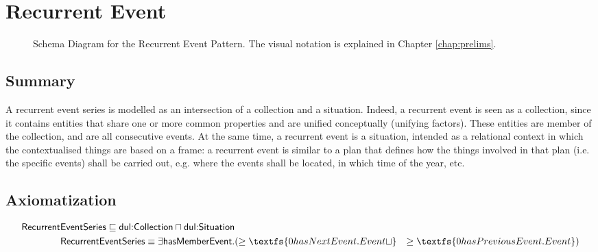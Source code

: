 \section{Recurrent Event}
\label{sec:recurrent-event}
\begin{figure}[h!]
\begin{center}
\end{center}
\caption{Schema Diagram for the Recurrent Event Pattern. The visual notation is explained in Chapter \ref{chap:prelims}.}
\label{fig:recurrent-event}
\end{figure}
\subsection{Summary}
\label{sum:recurrent-event}
A recurrent event series is modelled as an intersection of a collection and a situation. Indeed, a recurrent event is seen as a collection, since it contains entities that share one or more common properties and are unified conceptually (unifying factors). These entities are member of the collection, and are all consecutive events. At the same time, a recurrent event is a situation, intended as a relational context in which the contextualised things are based on a frame: a recurrent event is similar to a plan that defines how the things involved in that plan (i.e. the specific events) shall be carried out, e.g. where the events shall be located, in which time of the year, etc.

\subsection{Axiomatization}
\label{axs:recurrent-event}
\begin{align}
\textsf{RecurrentEventSeries} \sqsubseteq\textsf{dul:Collection} \sqcap \textsf{dul:Situation} \\
\textsf{RecurrentEventSeries} \equiv \exists \textsf{hasMemberEvent.}  &
(\geq \textfs{0hasNextEvent.Event \sqcup}  &
\geq \textfs{0hasPreviousEvent.Event})
\end{align}

